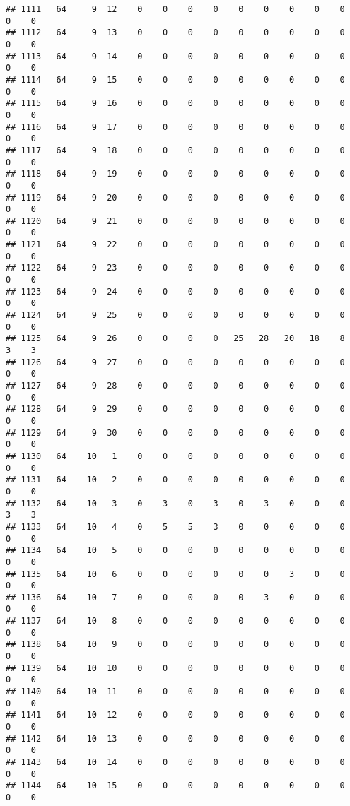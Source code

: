 \documentclass[]{article}
\begin{document}
\begin{verbatim}
## 1111   64     9  12    0    0    0    0    0    0    0    0    0    0    0
## 1112   64     9  13    0    0    0    0    0    0    0    0    0    0    0
## 1113   64     9  14    0    0    0    0    0    0    0    0    0    0    0
## 1114   64     9  15    0    0    0    0    0    0    0    0    0    0    0
## 1115   64     9  16    0    0    0    0    0    0    0    0    0    0    0
## 1116   64     9  17    0    0    0    0    0    0    0    0    0    0    0
## 1117   64     9  18    0    0    0    0    0    0    0    0    0    0    0
## 1118   64     9  19    0    0    0    0    0    0    0    0    0    0    0
## 1119   64     9  20    0    0    0    0    0    0    0    0    0    0    0
## 1120   64     9  21    0    0    0    0    0    0    0    0    0    0    0
## 1121   64     9  22    0    0    0    0    0    0    0    0    0    0    0
## 1122   64     9  23    0    0    0    0    0    0    0    0    0    0    0
## 1123   64     9  24    0    0    0    0    0    0    0    0    0    0    0
## 1124   64     9  25    0    0    0    0    0    0    0    0    0    0    0
## 1125   64     9  26    0    0    0    0   25   28   20   18    8    3    3
## 1126   64     9  27    0    0    0    0    0    0    0    0    0    0    0
## 1127   64     9  28    0    0    0    0    0    0    0    0    0    0    0
## 1128   64     9  29    0    0    0    0    0    0    0    0    0    0    0
## 1129   64     9  30    0    0    0    0    0    0    0    0    0    0    0
## 1130   64    10   1    0    0    0    0    0    0    0    0    0    0    0
## 1131   64    10   2    0    0    0    0    0    0    0    0    0    0    0
## 1132   64    10   3    0    3    0    3    0    3    0    0    0    3    3
## 1133   64    10   4    0    5    5    3    0    0    0    0    0    0    0
## 1134   64    10   5    0    0    0    0    0    0    0    0    0    0    0
## 1135   64    10   6    0    0    0    0    0    0    3    0    0    0    0
## 1136   64    10   7    0    0    0    0    0    3    0    0    0    0    0
## 1137   64    10   8    0    0    0    0    0    0    0    0    0    0    0
## 1138   64    10   9    0    0    0    0    0    0    0    0    0    0    0
## 1139   64    10  10    0    0    0    0    0    0    0    0    0    0    0
## 1140   64    10  11    0    0    0    0    0    0    0    0    0    0    0
## 1141   64    10  12    0    0    0    0    0    0    0    0    0    0    0
## 1142   64    10  13    0    0    0    0    0    0    0    0    0    0    0
## 1143   64    10  14    0    0    0    0    0    0    0    0    0    0    0
## 1144   64    10  15    0    0    0    0    0    0    0    0    0    0    0

\end{verbatim}
\end{document}
